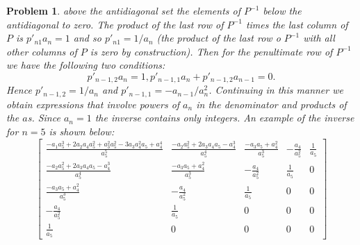 \documentclass{article}
\theoremstyle{pprop}
\newtheorem{problem}{Problem}[section]
\begin{document}
\begin{problem}
above the antidiagonal set the elements of $P^{-1}$ below the antidiagonal to zero. The product of the last row of $P^{-1}$ times 
the last column of $P$ is $p'_{n1}a_n=1$ and so $p'_{n1}=1/a_n$ (the product of the last row o $P^{-1}$ with all other columns 
of $P$ is zero by construction). Then for the penultimate row of $P^{-1}$ we have the following two conditions:
$$
p'_{n-1,2}a_n=1, p'_{n-1,1}a_n+p'_{n-1,2}a_{n-1}=0.
$$ 
Hence $p'_{n-1,2}=1/a_n$ and $p'_{n-1,1}=-a_{n-1}/a_n^2$. Continuing in this manner we obtain expressions that involve powers 
of $a_n$ in the denominator and products of the $a$s. Since $a_n=1$ the inverse contains only integers. An example of the inverse 
for $n=5$ is shown below:
$$
\left[\begin{matrix}\frac{- a_{1} a_{5}^{3} + 2 a_{2} a_{4} a_{5}^{2} + a_{3}^{2} a_{5}^{2} - 3 a_{3} a_{4}^{2} a_{5} + a_{4}^{4}}{a_{5}^{5}} & \frac{- a_{2} a_{5}^{2} + 2 a_{3} a_{4} a_{5} - a_{4}^{3}}{a_{5}^{4}} & \frac{- a_{3} a_{5} + a_{4}^{2}}{a_{5}^{3}} & - \frac{a_{4}}{a_{5}^{2}} & \frac{1}{a_{5}}\\\frac{- a_{2} a_{5}^{2} + 2 a_{3} a_{4} a_{5} - a_{4}^{3}}{a_{5}^{4}} & \frac{- a_{3} a_{5} + a_{4}^{2}}{a_{5}^{3}} & - \frac{a_{4}}{a_{5}^{2}} & \frac{1}{a_{5}} & 0\\\frac{- a_{3} a_{5} + a_{4}^{2}}{a_{5}^{3}} & - \frac{a_{4}}{a_{5}^{2}} & \frac{1}{a_{5}} & 0 & 0\\- \frac{a_{4}}{a_{5}^{2}} & \frac{1}{a_{5}} & 0 & 0 & 0\\\frac{1}{a_{5}} & 0 & 0 & 0 & 0\end{matrix}\right]
$$
\end{problem}
\end{document}
